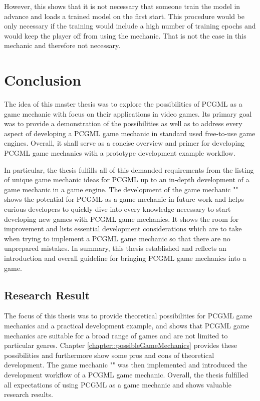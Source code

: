 \documentclass[MGS,Master,english]{twbook}%
\begin{document}
However, this shows that it is not necessary that someone train the model in advance and loads a trained model on the first start. This procedure would be only necessary if the training would include a high number of training epochs and would keep the player off from using the mechanic. That is not the case in this mechanic and therefore not necessary.

%
%
\clearpage
\chapter{Conclusion}
The idea of this master thesis was to explore the possibilities of PCGML as a game mechanic with focus on their applications in video games. Its primary goal was to provide a demonstration of the possibilities as well as to address every aspect of developing a PCGML game mechanic in standard used free-to-use game engines. Overall, it shall serve as a concise overview and primer for developing PCGML game mechanics with a prototype development example workflow.

In particular, the thesis fulfills all of this demanded requirements from the listing of unique game mechanic ideas for PCGML up to an in-depth development of a game mechanic in a game engine. The development of the game mechanic "" shows the potential for PCGML as a game mechanic in future work and helps curious developers to quickly dive into every knowledge necessary to start developing new games with PCGML game mechanics. It shows the room for improvement and lists essential development considerations which are to take when trying to implement a PCGML game mechanic so that there are no unprepared mistakes. In summary, this thesis established and reflects an introduction and overall guideline for bringing PCGML game mechanics into a game.

\section{Research Result}
The focus of this thesis was to provide theoretical possibilities for PCGML game mechanics and a practical development example, and shows that PCGML game mechanics are suitable for a broad range of games and are not limited to particular genres. Chapter \ref{chapter::possibleGameMechanics} provides these possibilities and furthermore show some pros and cons of theoretical development. The game mechanic "" was then implemented and introduced the development workflow of a PCGML game mechanic. Overall, the thesis fulfilled all expectations of using PCGML as a game mechanic and shows valuable research results.
\end{document}

